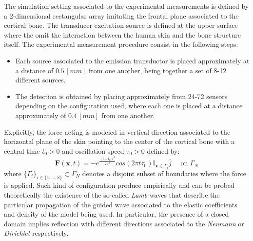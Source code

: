 The simulation setting associated to the experimental measurements is defined by a 2-dimensional rectangular array imitating the frontal plane associated to the cortical bone. The transducer excitation source is defined at the upper surface where the omit the interaction between the human skin and the bone structure itself. 
The experimental measurement procedure consist in the following steps:
\begin{itemize}
    \item Each source associated to the emission transductor is placed approximately at a distance of $0.5 \, [mm]$ from one another, being together a set of 8-12 different sources. 
    \item The detection is obtained by placing approximately from 24-72 sensors depending on the configuration used, where each one is placed at a distance approximately of $0.4 \, [mm]$ from one another.
\end{itemize}
Explicitly, the force acting is modeled in vertical direction associated to the horizontal plane of the skin pointing to the center of the cortical bone with a central time $t_0 > 0$ and oscillation speed $\tau_0 > 0$ defined by:
\begin{equation}
    \mathbf{F}(\mathbf{x},t) = - e^{\frac{(t-t_0)^2}{2\sigma^2}} cos( 2 \pi t \tau_0 ) \mathbb{I}_{\mathbf{x} \in \Gamma_i} \hat{j} \quad \text{ on } \Gamma_N
\end{equation}
where $\{ \Gamma_i\}_{ i \in \{1,\dots, 8\}} \subset \Gamma_N$ denotes a disjoint subset of boundaries where the force is applied. 
Such kind of configuration produce empirically and can be probed theoretically the existence of the so-called \textit{Lamb}-waves that describe the particular propagation of the guided wave associated to the elastic coefficients and density of the model being used.
In particular, the presence of a closed domain implies reflection with different directions associated to the \textit{Neumann} or \textit{Dirichlet} respectively.

